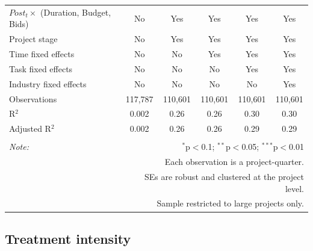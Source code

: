 \documentclass[
]{article}
\begin{document}
\begin{table}[H]
\begin{tabular}{@{\extracolsep{-10pt}}lccccc}
$Post_t \times $  (Duration, Budget, Bids) & No & Yes & Yes & Yes & Yes \\ 
Project stage & No & Yes & Yes & Yes & Yes \\ 
Time fixed effects & No & No & Yes & Yes & Yes \\ 
Task fixed effects & No & No & No & Yes & Yes \\ 
Industry fixed effects & No & No & No & No & Yes \\ 
Observations & 117,787 & 110,601 & 110,601 & 110,601 & 110,601 \\ 
R$^{2}$ & 0.002 & 0.26 & 0.26 & 0.30 & 0.30 \\ 
Adjusted R$^{2}$ & 0.002 & 0.26 & 0.26 & 0.29 & 0.29 \\ 
\hline 
\hline \\[-1.8ex] 
\textit{Note:}  & \multicolumn{5}{r}{$^{*}$p$<$0.1; $^{**}$p$<$0.05; $^{***}$p$<$0.01} \\ 
 & \multicolumn{5}{r}{Each observation is a project-quarter.} \\ 
 & \multicolumn{5}{r}{SEs are robust and clustered at the project level.} \\ 
 & \multicolumn{5}{r}{Sample restricted to large projects only.} \\ 
\end{tabular} 
\end{table}

\hypertarget{treatment-intensity}{%
\subsection{Treatment intensity}\label{treatment-intensity}}
\end{document}
